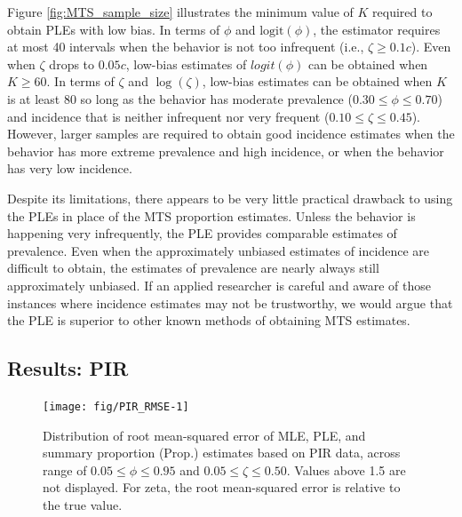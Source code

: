 \documentclass[man, noextraspace, floatsintext]{apa6}\usepackage[]{graphicx}\usepackage[]{color}
\newenvironment{knitrout}{}{} %
\newcommand{\logit}{\text{logit}}
\begin{document}
Figure \ref{fig:MTS_sample_size} illustrates the minimum value of $K$ required to obtain PLEs with low bias. 
In terms of $\phi$ and $\logit(\phi)$, the estimator requires at most 40 intervals when the behavior is not too infrequent (i.e., $\zeta \geq 0.1 c$).
Even when $\zeta$ drops to $0.05 c$, low-bias estimates of $logit(\phi)$ can be obtained when $K \geq 60$. 
In terms of $\zeta$ and $\log(\zeta)$, low-bias estimates can be obtained when $K$ is at least 80 so long as the behavior has moderate prevalence ($0.30 \leq \phi \leq 0.70$) and incidence that is neither infrequent nor very frequent ($0.10 \leq \zeta \leq 0.45$). 
However, larger samples are required to obtain good incidence estimates when the behavior has more extreme prevalence and high incidence, or when the behavior has very low incidence. 

Despite its limitations, there appears to be very little practical drawback to using the PLEs in place of the MTS proportion estimates. Unless the behavior is happening very infrequently, the PLE provides comparable estimates of prevalence. Even when the approximately unbiased estimates of incidence are difficult to obtain, the estimates of prevalence are nearly always still approximately unbiased. If an applied researcher is careful and aware of those instances where incidence estimates may not be trustworthy, we would argue that the PLE is superior to other known methods of obtaining MTS estimates.

\subsection{Results: PIR}

\begin{knitrout}
\color{fgcolor}\begin{figure}[tb]

{\centering \texttt{[image: fig/PIR\_RMSE-1]} 

}

\caption[Distribution of root mean-squared error of MLE, PLE, and summary proportion (Prop]{Distribution of root mean-squared error of MLE, PLE, and summary proportion (Prop.) estimates based on PIR data, across range of $0.05 \leq \phi \leq 0.95$ and $0.05 \leq \zeta \leq 0.50$. Values above 1.5 are not displayed. For zeta, the root mean-squared error is relative to the true value.}\label{fig:PIR_RMSE}
\end{figure}


\end{knitrout}
\end{document}
